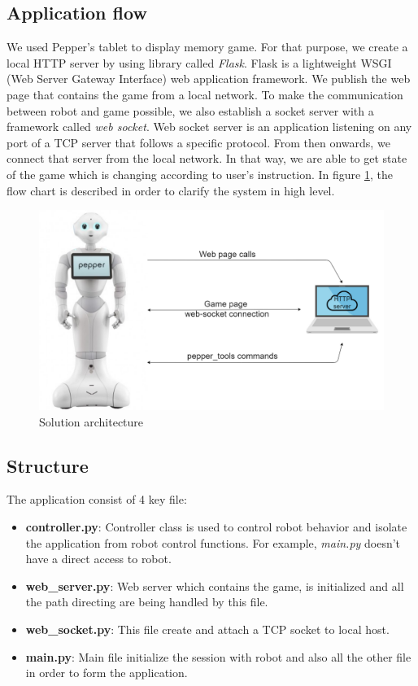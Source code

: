 \documentclass[12pt]{article}
\begin{document}
\subsection{Application flow}
We used Pepper's tablet to display memory game. For that purpose, we create a local HTTP server by using library called \textit{Flask}. Flask is a lightweight WSGI (Web Server Gateway Interface) web application framework. We publish the web page that contains the game from a local network. To make the communication between robot and game possible, we also establish a socket server with a framework called \textit{web socket}. Web socket server is an application listening on any port of a TCP server that follows a specific protocol. From then onwards,  we connect that server from the local network. In that way, we are able to get state of the game which is changing according to user's instruction. In figure \ref{fig:diagram}, the flow chart is described in order to clarify the system in high level.
\begin{figure}[H]
\centering
\includegraphics[scale=0.42]{images/http_scheme.png}
\caption{Solution architecture}
\label{fig:diagram}
\end{figure}
\subsection{Structure}
The application consist of 4 key file:
\begin{itemize}
\item \textbf{controller.py}: Controller class is used to control robot behavior and isolate the application from robot control functions. For example, \textit{main.py} doesn't have a direct access to robot.
\item \textbf{web\_server.py}: Web server which contains the game, is initialized and all the path directing are being handled by this file.
\item \textbf{web\_socket.py}: This file create and attach a TCP socket to local host.
\item \textbf{main.py}: Main file initialize the session with robot and also all the other file in order to form the application.
\end{itemize}
\end{document}
